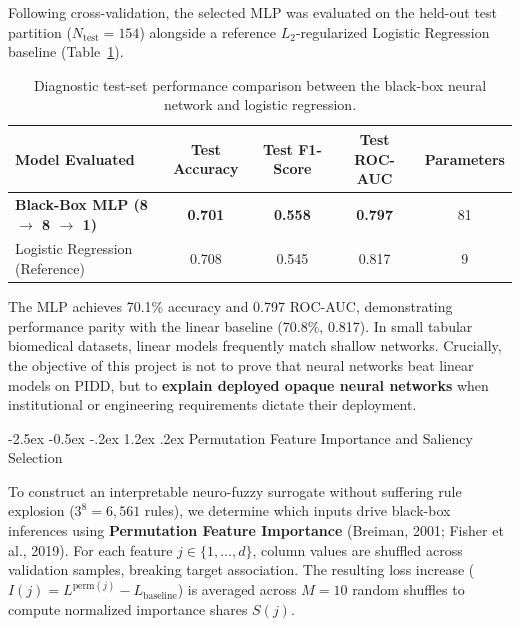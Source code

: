 \documentclass[12pt,a4paper,oneside]{report}
\makeatletter
\renewcommand\section{\@startsection {section}{1}{\z@}%
                                   {-2.5ex \@plus -0.5ex \@minus -.2ex}%
                                   {1.2ex \@plus .2ex}%
                                   {\normalfont\fontsize{13}{16}\selectfont\bfseries}}
\makeatother
\begin{document}
Following cross-validation, the selected MLP was evaluated on the held-out test partition ($N_{\text{test}} = 154$) alongside a reference $L_2$-regularized Logistic Regression baseline (Table~\ref{tab:diagnostic_performance}).

\begin{table}[htbp]
\centering
\footnotesize
\renewcommand{\arraystretch}{0.80}
\begin{tabularx}{\textwidth}{>{\raggedright\arraybackslash}X c c c c}
\toprule
\textbf{Model Evaluated} & \textbf{Test Accuracy} & \textbf{Test F1-Score} & \textbf{Test ROC-AUC} & \textbf{Parameters} \\
\midrule
\textbf{Black-Box MLP (8 $\to$ 8 $\to$ 1)} & \textbf{0.701} & \textbf{0.558} & \textbf{0.797} & 81 \\
Logistic Regression (Reference) & 0.708 & 0.545 & 0.817 & 9 \\
\bottomrule
\end{tabularx}
\caption[Diagnostic Test-Set Performance Comparison]{Diagnostic test-set performance comparison between the black-box neural network and logistic regression.}
\label{tab:diagnostic_performance}
\end{table}

The MLP achieves 70.1\% accuracy and 0.797 ROC-AUC, demonstrating performance parity with the linear baseline (70.8\%, 0.817). In small tabular biomedical datasets, linear models frequently match shallow networks. Crucially, the objective of this project is not to prove that neural networks beat linear models on PIDD, but to \textbf{explain deployed opaque neural networks} when institutional or engineering requirements dictate their deployment.

\section{Permutation Feature Importance and Saliency Selection}

To construct an interpretable neuro-fuzzy surrogate without suffering rule explosion ($3^8 = 6{,}561$ rules), we determine which inputs drive black-box inferences using \textbf{Permutation Feature Importance} (Breiman, 2001; Fisher et al., 2019). For each feature $j \in \{1, \dots, d\}$, column values are shuffled across validation samples, breaking target association. The resulting loss increase ($I(j) = L^{\text{perm}(j)} - L_{\text{baseline}}$) is averaged across $M=10$ random shuffles to compute normalized importance shares $S(j)$.
\end{document}
